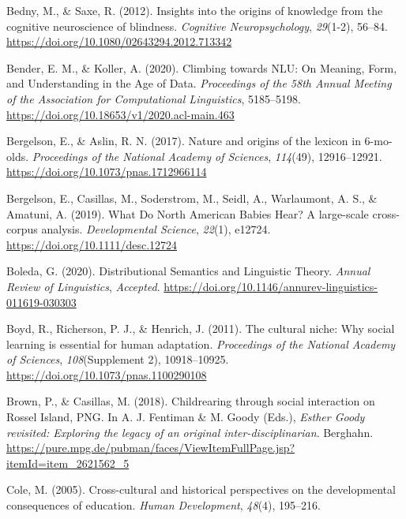 \documentclass[11pt,man]{article}
\newlength{\cslhangindent}
\newenvironment{cslreferences}%
  {\setlength{\parindent}{0pt}%
  \everypar{\setlength{\hangindent}{\cslhangindent}}\ignorespaces}%
  {\par}
\begin{document}
\hypertarget{refs}{}
\begin{cslreferences}
\leavevmode\hypertarget{ref-bedny_insights_2012}{}%
Bedny, M., \& Saxe, R. (2012). Insights into the origins of knowledge
from the cognitive neuroscience of blindness. \emph{Cognitive
Neuropsychology}, \emph{29}(1-2), 56--84.
\url{https://doi.org/10.1080/02643294.2012.713342}

\leavevmode\hypertarget{ref-bender_climbing_2020}{}%
Bender, E. M., \& Koller, A. (2020). Climbing towards NLU: On Meaning,
Form, and Understanding in the Age of Data. \emph{Proceedings of the
58th Annual Meeting of the Association for Computational Linguistics},
5185--5198. \url{https://doi.org/10.18653/v1/2020.acl-main.463}

\leavevmode\hypertarget{ref-bergelson_nature_2017}{}%
Bergelson, E., \& Aslin, R. N. (2017). Nature and origins of the lexicon
in 6-mo-olds. \emph{Proceedings of the National Academy of Sciences},
\emph{114}(49), 12916--12921.
\url{https://doi.org/10.1073/pnas.1712966114}

\leavevmode\hypertarget{ref-bergelson_what_2019}{}%
Bergelson, E., Casillas, M., Soderstrom, M., Seidl, A., Warlaumont, A.
S., \& Amatuni, A. (2019). What Do North American Babies Hear? A
large-scale cross-corpus analysis. \emph{Developmental Science},
\emph{22}(1), e12724. \url{https://doi.org/10.1111/desc.12724}

\leavevmode\hypertarget{ref-boleda_distributional_2020}{}%
Boleda, G. (2020). Distributional Semantics and Linguistic Theory.
\emph{Annual Review of Linguistics}, \emph{Accepted}.
\url{https://doi.org/10.1146/annurev-linguistics-011619-030303}

\leavevmode\hypertarget{ref-boyd_cultural_2011}{}%
Boyd, R., Richerson, P. J., \& Henrich, J. (2011). The cultural niche:
Why social learning is essential for human adaptation. \emph{Proceedings
of the National Academy of Sciences}, \emph{108}(Supplement 2),
10918--10925. \url{https://doi.org/10.1073/pnas.1100290108}

\leavevmode\hypertarget{ref-brown_childrearing_2018}{}%
Brown, P., \& Casillas, M. (2018). Childrearing through social
interaction on Rossel Island, PNG. In A. J. Fentiman \& M. Goody (Eds.),
\emph{Esther Goody revisited: Exploring the legacy of an original
inter-disciplinarian}. Berghahn.
\url{https://pure.mpg.de/pubman/faces/ViewItemFullPage.jsp?itemId=item_2621562_5}

\leavevmode\hypertarget{ref-cole_cross-cultural_2005}{}%
Cole, M. (2005). Cross-cultural and historical perspectives on the
developmental consequences of education. \emph{Human Development},
\emph{48}(4), 195--216.


\end{cslreferences}
\end{document}
